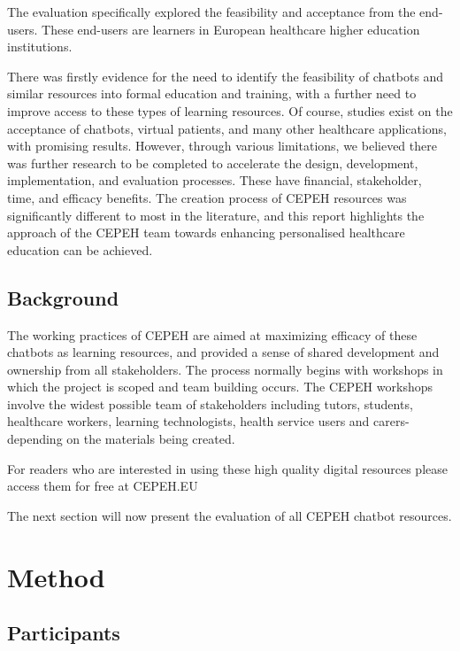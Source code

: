 \documentclass[a4paper, nobind]{templates/ociamthesis}
\begin{document}
The evaluation specifically explored the feasibility and acceptance from the end-users.
These end-users are learners in European healthcare higher education institutions.

There was firstly evidence for the need to identify the feasibility of chatbots and similar resources into formal education and training, with a further need to improve access to these types of learning resources.
Of course, studies exist on the acceptance of chatbots, virtual patients, and many other healthcare applications, with promising results.
However, through various limitations, we believed there was further research to be completed to accelerate the design, development, implementation, and evaluation processes.
These have financial, stakeholder, time, and efficacy benefits.
The creation process of CEPEH resources was significantly different to most in the literature, and this report highlights the approach of the CEPEH team towards enhancing personalised healthcare education can be achieved.

\hypertarget{sec-background}{%
\section*{Background}\label{sec-background}}

The working practices of CEPEH are aimed at maximizing efficacy of these chatbots as learning resources, and provided a sense of shared development and ownership from all stakeholders.
The process normally begins with workshops in which the project is scoped and team building occurs.
The CEPEH workshops involve the widest possible team of stakeholders including tutors, students, healthcare workers, learning technologists, health service users and carers- depending on the materials being created.

For readers who are interested in using these high quality digital resources please access them for free at CEPEH.EU

The next section will now present the evaluation of all CEPEH chatbot resources.

\hypertarget{method}{%
\chapter{Method}\label{method}}

\minitoc 

\hypertarget{participants}{%
\section{Participants}\label{participants}}
\end{document}

